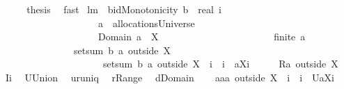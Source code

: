 \begin{isabellebody}
\ \ \isamarkupfalse%
\ \isamarkupfalse%
\ {\isacharquery}thesis\ \isamarkupfalse%
\ fast\isanewline
{}\isamarkupfalse%
%
\endisatagproof
{\isafoldproof}%
%
\isadelimproof
\isanewline
%
\endisadelimproof
\isanewline
{}\isamarkupfalse%
\ lm{}{}{\isacharcolon}\ \ {\isachardoublequoteopen}bidMonotonicity\ {\isacharparenleft}b{\isacharcolon}{\isacharcolon}{\isacharunderscore}\ {\isacharequal}{\isachargreater}\ real{\isacharparenright}\ i{\isachardoublequoteclose}\ \isanewline
\ \ \ \ \ \ \ \ \ \ \ \ \ \ \ \ \ \ \ \ {\isachardoublequoteopen}a\ {\isasymin}\ allocationsUniverse{\isachardoublequoteclose}\ \isanewline
\ \ \ \ \ \ \ \ \ \ \ \ \ \ \ \ \ \ \ \ {\isachardoublequoteopen}Domain\ a\ {\isasyminter}\ X\ {\isasymnoteq}\ {\isacharbraceleft}{\isacharbraceright}{\isachardoublequoteclose}\ \isanewline
\ \ \ \ \ \ \ \ \ \ \ \ \ \ \ \ \ \ \ \ {\isachardoublequoteopen}finite\ a{\isachardoublequoteclose}\isanewline
\ \ \ \ \ \ \ \ \ \ \ \ \ \ \ {\isachardoublequoteopen}setsum\ b\ {\isacharparenleft}a\ outside\ X{\isacharparenright}\ {\isasymle}\ \isanewline
\ \ \ \ \ \ \ \ \ \ \ \ \ \ \ \ \ \ \ \ \ setsum\ b\ {\isacharparenleft}a\ outside\ {\isacharparenleft}X\ {\isasymunion}\ {\isacharbraceleft}i{\isacharbraceright}{\isacharparenright}\ {\isasymunion}\ {\isacharparenleft}{\isacharbraceleft}i{\isacharbraceright}\ {\isasymtimes}\ {\isacharbraceleft}{\isasymUnion}{\isacharparenleft}a{\isacharbackquote}{\isacharbackquote}{\isacharparenleft}X{\isasymunion}{\isacharbraceleft}i{\isacharbraceright}{\isacharparenright}{\isacharparenright}{\isacharbraceright}{\isacharparenright}{\isacharparenright}{\isachardoublequoteclose}\isanewline
%
\isadelimproof
%
\endisadelimproof
%
\isatagproof
{}\isamarkupfalse%
\ {\isacharminus}\isanewline
\ \ \isamarkupfalse%
\ {\isacharquery}R{\isacharequal}{\isachardoublequoteopen}a\ outside\ X{\isachardoublequoteclose}\ \isamarkupfalse%
\ {\isacharquery}I{\isacharequal}{\isachardoublequoteopen}{\isacharbraceleft}i{\isacharbraceright}{\isachardoublequoteclose}\ \isamarkupfalse%
\ {\isacharquery}U{\isacharequal}Union\ \isamarkupfalse%
\ {\isacharquery}u{\isacharequal}runiq\ \isamarkupfalse%
\ {\isacharquery}r{\isacharequal}Range\ \isamarkupfalse%
\ {\isacharquery}d{\isacharequal}Domain\isanewline
\ \ \isamarkupfalse%
\ {\isacharquery}aa{\isacharequal}{\isachardoublequoteopen}a\ outside\ {\isacharparenleft}X\ {\isasymunion}\ {\isacharbraceleft}i{\isacharbraceright}{\isacharparenright}\ {\isasymunion}\ {\isacharparenleft}{\isacharbraceleft}i{\isacharbraceright}\ {\isasymtimes}\ {\isacharbraceleft}{\isacharquery}U{\isacharparenleft}a{\isacharbackquote}{\isacharbackquote}{\isacharparenleft}X{\isasymunion}{\isacharbraceleft}i{\isacharbraceright}{\isacharparenright}{\isacharparenright}{\isacharbraceright}{\isacharparenright}{\isachardoublequoteclose}\isanewline

\end{isabellebody}

